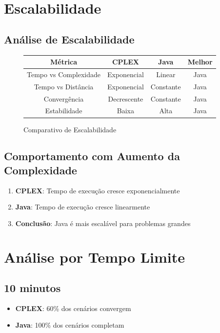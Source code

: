 \documentclass[12pt,a4paper]{article}
\begin{document}
\section{Escalabilidade}

\subsection{Análise de Escalabilidade}

\begin{figure}[H]
\centering
\begin{tabular}{|c|c|c|c|}
\hline
\textbf{Métrica} & \textbf{CPLEX} & \textbf{Java} & \textbf{Melhor} \\
\hline
Tempo vs Complexidade & Exponencial & Linear & Java \\
Tempo vs Distância & Exponencial & Constante & Java \\
Convergência & Decrescente & Constante & Java \\
Estabilidade & Baixa & Alta & Java \\
\hline
\end{tabular}
\caption{Comparativo de Escalabilidade}
\end{figure}

\subsection{Comportamento com Aumento da Complexidade}

\begin{enumerate}
    \item \textbf{CPLEX}: Tempo de execução cresce exponencialmente
    \item \textbf{Java}: Tempo de execução cresce linearmente
    \item \textbf{Conclusão}: Java é mais escalável para problemas grandes
\end{enumerate}

\section{Análise por Tempo Limite}

\subsection{10 minutos}

\begin{itemize}
    \item \textbf{CPLEX}: 60\% dos cenários convergem
    \item \textbf{Java}: 100\% dos cenários completam
\end{itemize}
\end{document}
